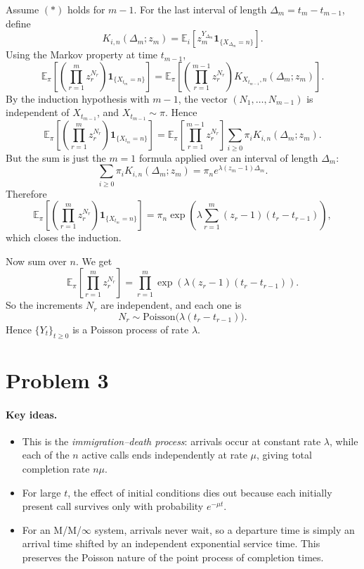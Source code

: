 \documentclass[11pt]{article}
\newcommand{\E}{\mathbb{E}}
\newcommand{\1}{\mathbf{1}}
\begin{document}
Assume \((*)\) holds for \(m-1\). For the last interval of length \(\Delta_m=t_m-t_{m-1}\), define
\[
    K_{i,n}(\Delta_m;z_m)
    =
    \E_i\!\left[z_m^{Y_{\Delta_m}}\1_{\{X_{\Delta_m}=n\}}\right].
\]
Using the Markov property at time \(t_{m-1}\),
\[
    \E_\pi\!\left[\left(\prod_{r=1}^m z_r^{N_r}\right)\1_{\{X_{t_m}=n\}}\right]
    =
    \E_\pi\!\left[\left(\prod_{r=1}^{m-1} z_r^{N_r}\right)K_{X_{t_{m-1}},n}(\Delta_m;z_m)\right].
\]
By the induction hypothesis with \(m-1\), the vector \((N_1,\dots,N_{m-1})\) is independent of \(X_{t_{m-1}}\), and \(X_{t_{m-1}} \sim \pi\). Hence
\[
    \E_\pi\!\left[\left(\prod_{r=1}^m z_r^{N_r}\right)\1_{\{X_{t_m}=n\}}\right]
    =
    \E_\pi\!\left[\prod_{r=1}^{m-1} z_r^{N_r}\right]
    \sum_{i \ge 0} \pi_i K_{i,n}(\Delta_m;z_m).
\]
But the sum is just the \(m=1\) formula applied over an interval of length \(\Delta_m\):
\[
    \sum_{i \ge 0} \pi_i K_{i,n}(\Delta_m;z_m)
    =
    \pi_n e^{\lambda(z_m-1)\Delta_m}.
\]
Therefore
\[
    \E_\pi\!\left[\left(\prod_{r=1}^m z_r^{N_r}\right)\1_{\{X_{t_m}=n\}}\right]
    =
    \pi_n
    \exp\!\left(\lambda\sum_{r=1}^m (z_r-1)(t_r-t_{r-1})\right),
\]
which closes the induction.

Now sum over \(n\). We get
\[
    \E_\pi\!\left[\prod_{r=1}^m z_r^{N_r}\right]
    =
    \prod_{r=1}^m \exp\!\left(\lambda(z_r-1)(t_r-t_{r-1})\right).
\]
So the increments \(N_r\) are independent, and each one is
\[
    N_r \sim \mathrm{Poisson}\bigl(\lambda(t_r-t_{r-1})\bigr).
\]
Hence \(\{Y_t\}_{t \ge 0}\) is a Poisson process of rate \(\lambda\).

\section*{Problem 3}
\paragraph{Key ideas.}
\begin{itemize}
    \item This is the \emph{immigration--death process}: arrivals occur at constant rate \(\lambda\), while each of the \(n\) active calls ends independently at rate \(\mu\), giving total completion rate \(n\mu\).
    \item For large \(t\), the effect of initial conditions dies out because each initially present call survives only with probability \(e^{-\mu t}\).
    \item For an M/M/\(\infty\) system, arrivals never wait, so a departure time is simply an arrival time shifted by an independent exponential service time. This preserves the Poisson nature of the point process of completion times.
\end{itemize}
\end{document}

